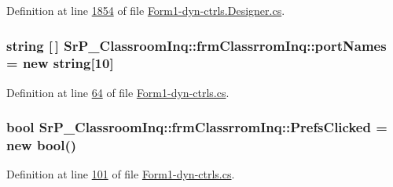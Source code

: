 \-Definition at line \hyperlink{_form1-dyn-ctrls_8_designer_8cs_source_l01854}{1854} of file \hyperlink{_form1-dyn-ctrls_8_designer_8cs_source}{\-Form1-\/dyn-\/ctrls.\-Designer.\-cs}.

\hypertarget{class_sr_p___classroom_inq_1_1frm_classrrom_inq_a9c5b06a44069e68e732d7bcd7a8fa08c}{
\subsubsection[{port\-Names}]{\setlength{\rightskip}{0pt plus 5cm}string \mbox{[}$\,$\mbox{]} {\bf \-Sr\-P\-\_\-\-Classroom\-Inq\-::frm\-Classrrom\-Inq\-::port\-Names} = new string\mbox{[}10\mbox{]}}}
\label{class_sr_p___classroom_inq_1_1frm_classrrom_inq_a9c5b06a44069e68e732d7bcd7a8fa08c}


\-Definition at line \hyperlink{_form1-dyn-ctrls_8cs_source_l00064}{64} of file \hyperlink{_form1-dyn-ctrls_8cs_source}{\-Form1-\/dyn-\/ctrls.\-cs}.

\hypertarget{class_sr_p___classroom_inq_1_1frm_classrrom_inq_a9e5a6ce376468f2e13dae9f60e86ccf6}{
\subsubsection[{\-Prefs\-Clicked}]{\setlength{\rightskip}{0pt plus 5cm}bool {\bf \-Sr\-P\-\_\-\-Classroom\-Inq\-::frm\-Classrrom\-Inq\-::\-Prefs\-Clicked} = new bool()}}
\label{class_sr_p___classroom_inq_1_1frm_classrrom_inq_a9e5a6ce376468f2e13dae9f60e86ccf6}


\-Definition at line \hyperlink{_form1-dyn-ctrls_8cs_source_l00101}{101} of file \hyperlink{_form1-dyn-ctrls_8cs_source}{\-Form1-\/dyn-\/ctrls.\-cs}.

